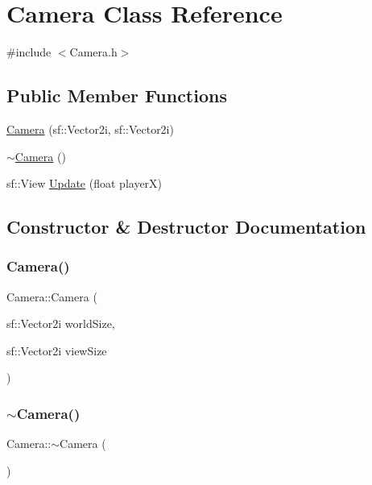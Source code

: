\hypertarget{class_camera}{}\section{Camera Class Reference}
\label{class_camera}


{\ttfamily \#include $<$Camera.\+h$>$}

\subsection*{Public Member Functions}
\begin{DoxyCompactItemize}
\item 
\hyperlink{class_camera_ac66d9226b88695dcd665d9c089b18219}{Camera} (sf\+::\+Vector2i, sf\+::\+Vector2i)
\item 
\hyperlink{class_camera_ad1897942d0ccf91052386388a497349f}{$\sim$\+Camera} ()
\item 
sf\+::\+View \hyperlink{class_camera_a261c43250d32bcc95b26f092225a9d2f}{Update} (float playerX)
\end{DoxyCompactItemize}


\subsection{Constructor \& Destructor Documentation}
\mbox{\label{class_camera_ac66d9226b88695dcd665d9c089b18219}} 
\subsubsection{\texorpdfstring{Camera()}{Camera()}}
{\footnotesize\ttfamily Camera\+::\+Camera (\begin{DoxyParamCaption}\item[{sf\+::\+Vector2i}]{world\+Size,  }\item[{sf\+::\+Vector2i}]{view\+Size }\end{DoxyParamCaption})}

\mbox{\label{class_camera_ad1897942d0ccf91052386388a497349f}} 
\subsubsection{\texorpdfstring{$\sim$\+Camera()}{~Camera()}}
{\footnotesize\ttfamily Camera\+::$\sim$\+Camera (\begin{DoxyParamCaption}{ }\end{DoxyParamCaption})}



